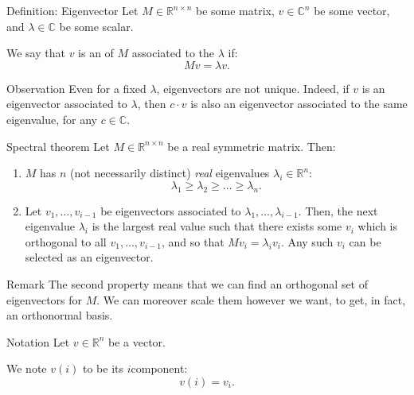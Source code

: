 \documentclass[a4paper]{article}
\begin{document}
\begin{parag}{Definition: Eigenvector}
    Let $M \in \mathbb{R}^{n\times n}$ be some matrix, $v \in \mathbb{C}^{n}$ be some vector, and $\lambda \in \mathbb{C}$ be some scalar.

    We say that $v$ is an  of $M$ associated to the  $\lambda$ if: 
    \[M v = \lambda v.\]

    \begin{subparag}{Observation}
        Even for a fixed $\lambda$, eigenvectors are not unique. Indeed, if $v$ is an eigenvector associated to $\lambda$, then $c\cdot v$ is also an eigenvector associated to the same eigenvalue, for any $c \in \mathbb{C}$.
    \end{subparag}
\end{parag}

\begin{parag}{Spectral theorem}
    Let $M \in \mathbb{R}^{n \times n}$ be a real symmetric matrix. Then: 
    \begin{enumerate}
        \item $M$ has $n$ (not necessarily distinct) \textit{real} eigenvalues $\lambda_i \in \mathbb{R}^n$: 
        \[\lambda_1 \geq \lambda_2 \geq \ldots \geq \lambda_n.\]
        \item Let $v_1, \ldots, v_{i-1}$ be eigenvectors associated to $\lambda_1, \ldots, \lambda_{i-1}$. Then, the next eigenvalue $\lambda_i$ is the largest real value such that there exists some $v_i$ which is orthogonal to all $v_1, \ldots, v_{i-1}$, and so that $M v_i = \lambda_i v_i$. Any such $v_i$ can be selected as an eigenvector.
    \end{enumerate}

    \begin{subparag}{Remark}
        The second property means that we can find an orthogonal set of eigenvectors for $M$. We can moreover scale them however we want, to get, in fact, an orthonormal basis.
    \end{subparag}
\end{parag}

\begin{parag}{Notation}
    Let $v \in \mathbb{R}^n$ be a vector.

    We note $v\left(i\right)$ to be its $i$\Th component: 
    \[v\left(i\right) = v_i.\]
\end{parag}
\end{document}
